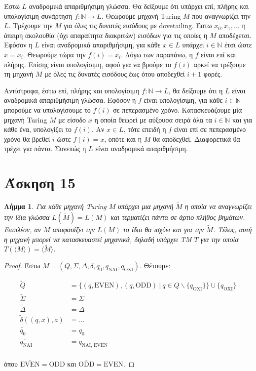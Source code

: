 \documentclass[a4paper, oneside, 11pt]{article}
\newtheorem{lm}[thm]{Λήμμα}
\theoremstyle{definition}
\begin{document}
Έστω $L$ αναδρομικά απαριθμήσιμη γλώσσα. Θα δείξουμε ότι υπάρχει επί, πλήρης και υπολογίσιμη
συνάρτηση $f:\mathbb{N}\rightarrow L$. Θεωρούμε μηχανή Turing $M$ που αναγνωρίζει την $L$.
Τρέχουμε την $M$ για όλες τις δυνατές εισόδους με dovetailing. Έστω $x_0, x_1, ... $ η άπειρη
ακολουθία (όχι απαραίτητα διακριτών) εισόδων για τις οποίες η $M$ αποδέχεται. Εφόσον η $L$ είναι
αναδρομικά απαριθμήσιμη, για κάθε $x\in L$ υπάρχει $i\in \mathbb{N}$ έτσι ώστε $x=x_i$.
Θεωρούμε τώρα την $f(i) = x_i$. Λόγω των παραπάνω, η $f$ είναι επί και πλήρης. Επίσης είναι
υπολογίσιμη, αφού για να βρούμε το $f(i)$ αρκεί να τρέξουμε τη μηχανή $M$ με όλες τις δυνατές
εισόδους έως ότου αποδεχθεί $i+1$ φορές. 

Αντίστροφα, έστω επί, πλήρης και υπολογίσιμη $f:\mathbb{N}\rightarrow L$, θα δείξουμε ότι η $L$
είναι αναδρομικά απαριθμήσιμη γλώσσα. Εφόσον η $f$ είναι υπολογίσιμη, για κάθε $i\in \mathbb{N}$
μπορούμε να υπολογίσουμε το $f(i)$ σε πεπερασμένο χρόνο. Κατασκευάζουμε μία μηχανή Turing $M$
με είσοδο $x$ η οποία θεωρεί με αύξουσα σειρά όλα τα $i\in \mathbb{N}$ και για κάθε ένα, 
υπολογίζει το $f(i)$. Αν $x\in L$, τότε επειδή η $f$ είναι επί σε πεπερασμένο χρόνο 
θα βρεθεί $i$ ώστε $f(i)=x$, οπότε και
η $M$ θα αποδεχθεί. Διαφορετικά θα τρέχει για πάντα. Συνεπώς η $L$ είναι αναδρομικά απαριθμήσιμη.

\section*{Άσκηση 15}

\begin{lm}
Για κάθε μηχανή Turing $Μ$ υπάρχει μια μηχανή $\widetilde{M}$ η οποία να αναγνωρίζει
την ίδια γλώσσα $L(\widetilde{M}) = L(M)$ και τερματίζει πάντα σε άρτιο πλήθος
βημάτων. Επιπλέον, αν $M$ \emph{αποφασίζει} την $L(M)$ το ίδιο θα ισχύει και για την
$\widetilde{M}$. Τέλος, αυτή η μηχανή μπορεί να κατασκευαστεί μηχανικά, δηλαδή
υπάρχει TM $T$ για την οποία $T(\langle M \rangle) = \langle \widetilde{M} \rangle$.
\end{lm}

\begin{proof}
Έστω $M = (Q, \Sigma, \Delta, \delta, q_0, q_\text{ΝΑΙ}, q_\text{ΟΧΙ})$.
Θέτουμε:

\begin{align*}
\widetilde{Q} &= \{ (q, \text{EVEN}), (q, \text{ODD})\ |\ q \in Q\backslash
   \{q_\text{ΟΧΙ}\} \} \cup \{ q_\text{ΟΧΙ} \}\\
\widetilde{\Sigma} &= \Sigma\\
\widetilde{\Delta} &= \Delta\\
\widetilde{\delta}( (q, x), a ) &= \ldots\\
\widetilde{q_0} &= q_0\\
\widetilde{q_\text{ΝΑΙ}} &= q_\text{ΝΑΙ, EVEN}\\
\end{align*}

όπου $\overline{\text{EVEN}} = \text{ODD}$ και $\overline{\text{ODD}} =
\text{EVEN}$.
\end{proof}
\end{document}
